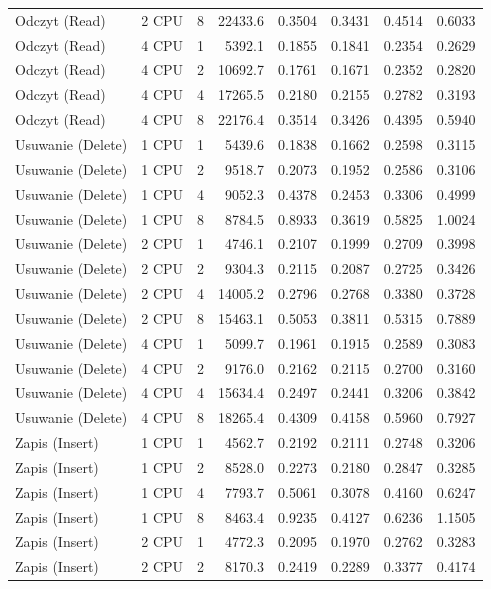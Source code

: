 \begin{table}[ht]
{\begin{tabular}{llcrrrrr}
Odczyt (Read) & 2 CPU & 8 & 22433.6 & 0.3504 & 0.3431 & 0.4514 & 0.6033 \\
Odczyt (Read) & 4 CPU & 1 & 5392.1 & 0.1855 & 0.1841 & 0.2354 & 0.2629 \\
Odczyt (Read) & 4 CPU & 2 & 10692.7 & 0.1761 & 0.1671 & 0.2352 & 0.2820 \\
Odczyt (Read) & 4 CPU & 4 & 17265.5 & 0.2180 & 0.2155 & 0.2782 & 0.3193 \\
Odczyt (Read) & 4 CPU & 8 & 22176.4 & 0.3514 & 0.3426 & 0.4395 & 0.5940 \\
Usuwanie (Delete) & 1 CPU & 1 & 5439.6 & 0.1838 & 0.1662 & 0.2598 & 0.3115 \\
Usuwanie (Delete) & 1 CPU & 2 & 9518.7 & 0.2073 & 0.1952 & 0.2586 & 0.3106 \\
Usuwanie (Delete) & 1 CPU & 4 & 9052.3 & 0.4378 & 0.2453 & 0.3306 & 0.4999 \\
Usuwanie (Delete) & 1 CPU & 8 & 8784.5 & 0.8933 & 0.3619 & 0.5825 & 1.0024 \\
Usuwanie (Delete) & 2 CPU & 1 & 4746.1 & 0.2107 & 0.1999 & 0.2709 & 0.3998 \\
Usuwanie (Delete) & 2 CPU & 2 & 9304.3 & 0.2115 & 0.2087 & 0.2725 & 0.3426 \\
Usuwanie (Delete) & 2 CPU & 4 & 14005.2 & 0.2796 & 0.2768 & 0.3380 & 0.3728 \\
Usuwanie (Delete) & 2 CPU & 8 & 15463.1 & 0.5053 & 0.3811 & 0.5315 & 0.7889 \\
Usuwanie (Delete) & 4 CPU & 1 & 5099.7 & 0.1961 & 0.1915 & 0.2589 & 0.3083 \\
Usuwanie (Delete) & 4 CPU & 2 & 9176.0 & 0.2162 & 0.2115 & 0.2700 & 0.3160 \\
Usuwanie (Delete) & 4 CPU & 4 & 15634.4 & 0.2497 & 0.2441 & 0.3206 & 0.3842 \\
Usuwanie (Delete) & 4 CPU & 8 & 18265.4 & 0.4309 & 0.4158 & 0.5960 & 0.7927 \\
Zapis (Insert) & 1 CPU & 1 & 4562.7 & 0.2192 & 0.2111 & 0.2748 & 0.3206 \\
Zapis (Insert) & 1 CPU & 2 & 8528.0 & 0.2273 & 0.2180 & 0.2847 & 0.3285 \\
Zapis (Insert) & 1 CPU & 4 & 7793.7 & 0.5061 & 0.3078 & 0.4160 & 0.6247 \\
Zapis (Insert) & 1 CPU & 8 & 8463.4 & 0.9235 & 0.4127 & 0.6236 & 1.1505 \\
Zapis (Insert) & 2 CPU & 1 & 4772.3 & 0.2095 & 0.1970 & 0.2762 & 0.3283 \\
Zapis (Insert) & 2 CPU & 2 & 8170.3 & 0.2419 & 0.2289 & 0.3377 & 0.4174 \\

\end{tabular}}
\end{table}
